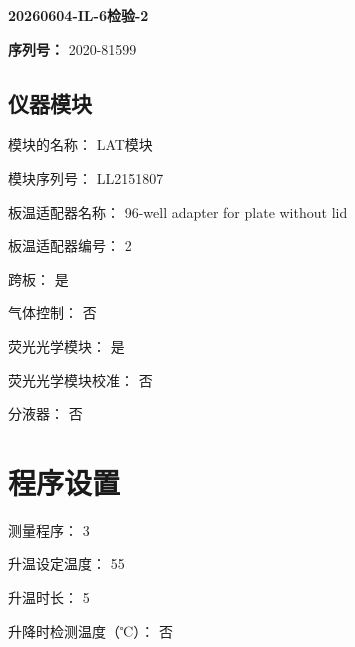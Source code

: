 \documentclass[UTF8,10pt,a4paper,fontset=fandol]{ctexart}
\newcommand{\fieldvalue}[1]{#1}
\begin{document}
\newpage

\noindent
\textbf{20260604-IL-6检验-2}

\vspace{0.5em}

\noindent
\textbf{序列号：}
\fieldvalue{2020-81599}

\subsection*{仪器模块}

\noindent
模块的名称：
\fieldvalue{LAT模块}

\noindent
模块序列号：
\fieldvalue{LL2151807}

\noindent
板温适配器名称：
\fieldvalue{96-well adapter for plate without lid}

\noindent
板温适配器编号：
\fieldvalue{2}

\noindent
跨板：
\fieldvalue{是}

\noindent
气体控制：
\fieldvalue{否}

\noindent
荧光光学模块：
\fieldvalue{是}

\noindent
荧光光学模块校准：
\fieldvalue{否}

\noindent
分液器：
\fieldvalue{否}

\section*{程序设置}

\noindent
测量程序：
\fieldvalue{3}

\noindent
升温设定温度：
\fieldvalue{55}

\noindent
升温时长：
\fieldvalue{5}

\noindent
升降时检测温度（℃）：
\fieldvalue{否}
\end{document}
